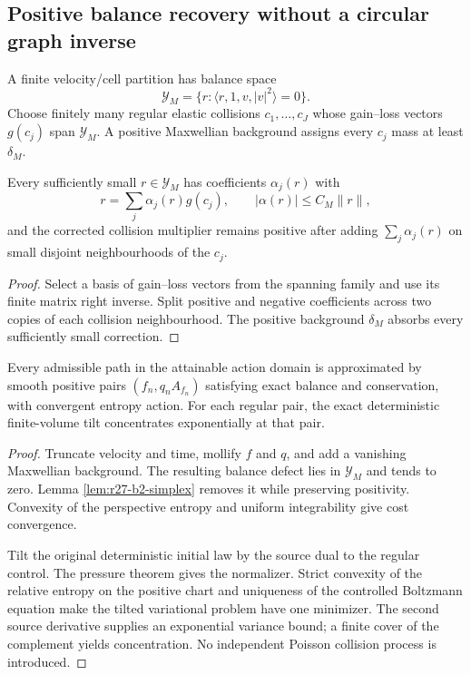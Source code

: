 \subsection{Positive balance recovery without a circular graph inverse}

A finite velocity/cell partition has balance space
\[
 \mathcal Y_M=\{r:\langle r,1,v,|v|^2\rangle=0\}.
\]
Choose finitely many regular elastic collisions
$c_1,\ldots,c_J$ whose gain--loss vectors $g(c_j)$ span $\mathcal Y_M$.
A positive Maxwellian background assigns every $c_j$ mass at least $\delta_M$.

\begin{lemma}
\label{lem:r27-b2-simplex}
Every sufficiently small $r\in\mathcal Y_M$ has coefficients
$\alpha_j(r)$ with
\[
 r=\sum_j\alpha_j(r)g(c_j),\qquad
 |\alpha(r)|\le C_M\|r\|,
\]
and the corrected collision multiplier remains positive after adding
$\sum_j\alpha_j(r)$ on small disjoint neighbourhoods of the $c_j$.
\end{lemma}

\begin{proof}
Select a basis of gain--loss vectors from the spanning family and use its
finite matrix right inverse.  Split positive and negative coefficients across
two copies of each collision neighbourhood.  The positive background
$\delta_M$ absorbs every sufficiently small correction.
\end{proof}

\begin{theorem}
\label{thm:r27-b2-recovery}
Every admissible path in the attainable action domain is approximated by
smooth positive pairs $(f_n,q_nA_{f_n})$ satisfying exact balance and
conservation, with convergent entropy action.  For each regular pair, the
exact deterministic finite-volume tilt concentrates exponentially at that
pair.
\end{theorem}

\begin{proof}
Truncate velocity and time, mollify $f$ and $q$, and add a vanishing
Maxwellian background.  The resulting balance defect lies in
$\mathcal Y_M$ and tends to zero.  Lemma \ref{lem:r27-b2-simplex} removes it
while preserving positivity.  Convexity of the perspective entropy and
uniform integrability give cost convergence.

Tilt the original deterministic initial law by the source dual to the regular
control.  The pressure theorem gives the normalizer.  Strict convexity of the
relative entropy on the positive chart and uniqueness of the controlled
Boltzmann equation make the tilted variational problem have one minimizer.
The second source derivative supplies an exponential variance bound; a finite
cover of the complement yields concentration.  No independent Poisson
collision process is introduced.
\end{proof}


